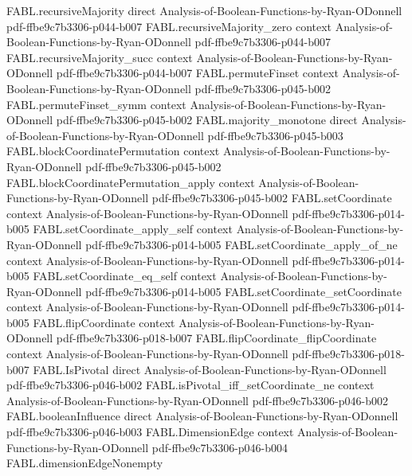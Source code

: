 \begin{theorem}
\proofstep
  {FABL.recursiveMajority}
  {direct}
  {Analysis-of-Boolean-Functions-by-Ryan-ODonnell}
  {pdf-ffbe9c7b3306-p044-b007}
\proofstep
  {FABL.recursiveMajority_zero}
  {context}
  {Analysis-of-Boolean-Functions-by-Ryan-ODonnell}
  {pdf-ffbe9c7b3306-p044-b007}
\proofstep
  {FABL.recursiveMajority_succ}
  {context}
  {Analysis-of-Boolean-Functions-by-Ryan-ODonnell}
  {pdf-ffbe9c7b3306-p044-b007}
\proofstep
  {FABL.permuteFinset}
  {context}
  {Analysis-of-Boolean-Functions-by-Ryan-ODonnell}
  {pdf-ffbe9c7b3306-p045-b002}
\proofstep
  {FABL.permuteFinset_symm}
  {context}
  {Analysis-of-Boolean-Functions-by-Ryan-ODonnell}
  {pdf-ffbe9c7b3306-p045-b002}
\proofstep
  {FABL.majority_monotone}
  {direct}
  {Analysis-of-Boolean-Functions-by-Ryan-ODonnell}
  {pdf-ffbe9c7b3306-p045-b003}
\proofstep
  {FABL.blockCoordinatePermutation}
  {context}
  {Analysis-of-Boolean-Functions-by-Ryan-ODonnell}
  {pdf-ffbe9c7b3306-p045-b002}
\proofstep
  {FABL.blockCoordinatePermutation_apply}
  {context}
  {Analysis-of-Boolean-Functions-by-Ryan-ODonnell}
  {pdf-ffbe9c7b3306-p045-b002}
\proofstep
  {FABL.setCoordinate}
  {context}
  {Analysis-of-Boolean-Functions-by-Ryan-ODonnell}
  {pdf-ffbe9c7b3306-p014-b005}
\proofstep
  {FABL.setCoordinate_apply_self}
  {context}
  {Analysis-of-Boolean-Functions-by-Ryan-ODonnell}
  {pdf-ffbe9c7b3306-p014-b005}
\proofstep
  {FABL.setCoordinate_apply_of_ne}
  {context}
  {Analysis-of-Boolean-Functions-by-Ryan-ODonnell}
  {pdf-ffbe9c7b3306-p014-b005}
\proofstep
  {FABL.setCoordinate_eq_self}
  {context}
  {Analysis-of-Boolean-Functions-by-Ryan-ODonnell}
  {pdf-ffbe9c7b3306-p014-b005}
\proofstep
  {FABL.setCoordinate_setCoordinate}
  {context}
  {Analysis-of-Boolean-Functions-by-Ryan-ODonnell}
  {pdf-ffbe9c7b3306-p014-b005}
\proofstep
  {FABL.flipCoordinate}
  {context}
  {Analysis-of-Boolean-Functions-by-Ryan-ODonnell}
  {pdf-ffbe9c7b3306-p018-b007}
\proofstep
  {FABL.flipCoordinate_flipCoordinate}
  {context}
  {Analysis-of-Boolean-Functions-by-Ryan-ODonnell}
  {pdf-ffbe9c7b3306-p018-b007}
\proofstep
  {FABL.IsPivotal}
  {direct}
  {Analysis-of-Boolean-Functions-by-Ryan-ODonnell}
  {pdf-ffbe9c7b3306-p046-b002}
\proofstep
  {FABL.isPivotal_iff_setCoordinate_ne}
  {context}
  {Analysis-of-Boolean-Functions-by-Ryan-ODonnell}
  {pdf-ffbe9c7b3306-p046-b002}
\proofstep
  {FABL.booleanInfluence}
  {direct}
  {Analysis-of-Boolean-Functions-by-Ryan-ODonnell}
  {pdf-ffbe9c7b3306-p046-b003}
\proofstep
  {FABL.DimensionEdge}
  {context}
  {Analysis-of-Boolean-Functions-by-Ryan-ODonnell}
  {pdf-ffbe9c7b3306-p046-b004}
\proofstep
  {FABL.dimensionEdgeNonempty}

\end{theorem}
